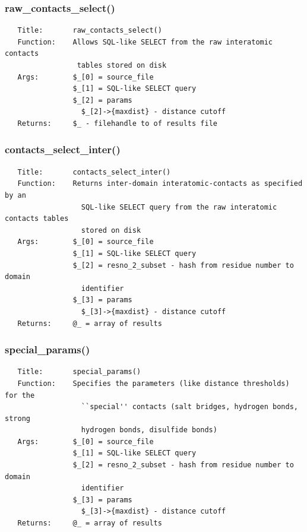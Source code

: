 \documentclass{article}
\begin{document}
\subsubsection*{raw\_contacts\_select()\label{pibase::interatomic_contacts_raw_contacts_select_}}
\begin{verbatim}
   Title:       raw_contacts_select()
   Function:    Allows SQL-like SELECT from the raw interatomic contacts
                 tables stored on disk
   Args:        $_[0] = source_file
                $_[1] = SQL-like SELECT query
                $_[2] = params
                  $_[2]->{maxdist} - distance cutoff
   Returns:     $_ - filehandle to of results file
\end{verbatim}
\subsubsection*{contacts\_select\_inter()\label{pibase::interatomic_contacts_contacts_select_inter_}}
\begin{verbatim}
   Title:       contacts_select_inter()
   Function:    Returns inter-domain interatomic-contacts as specified by an
                  SQL-like SELECT query from the raw interatomic contacts tables
                  stored on disk
   Args:        $_[0] = source_file
                $_[1] = SQL-like SELECT query
                $_[2] = resno_2_subset - hash from residue number to domain
                  identifier
                $_[3] = params
                  $_[3]->{maxdist} - distance cutoff
   Returns:     @_ = array of results
\end{verbatim}
\subsubsection*{special\_params()\label{pibase::interatomic_contacts_special_params_}}
\begin{verbatim}
   Title:       special_params()
   Function:    Specifies the parameters (like distance thresholds) for the
                  ``special'' contacts (salt bridges, hydrogen bonds, strong
                  hydrogen bonds, disulfide bonds)
   Args:        $_[0] = source_file
                $_[1] = SQL-like SELECT query
                $_[2] = resno_2_subset - hash from residue number to domain
                  identifier
                $_[3] = params
                  $_[3]->{maxdist} - distance cutoff
   Returns:     @_ = array of results
\end{verbatim}
\end{document}
